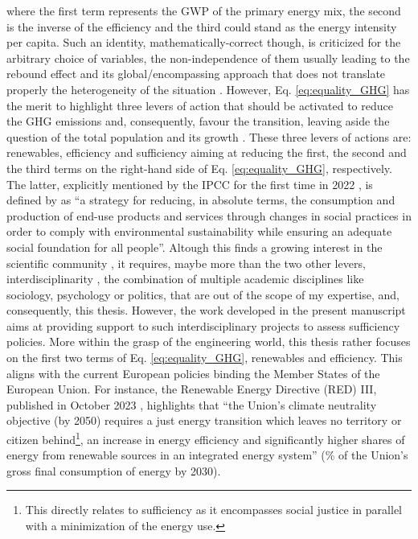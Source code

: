 \noindent
where the first term represents the \gls{GWP} of the primary energy mix, the second is the inverse of the efficiency and the third could stand as the energy intensity per capita. Such an identity, mathematically-correct though, is criticized for the arbitrary choice of variables, the non-independence of them usually leading to the rebound effect and its global/encompassing approach that does not translate properly the heterogeneity of the situation \cite{IPCC2000}. However, Eq. \ref{eq:equality_GHG} has the merit to highlight three levers of action that should be activated to reduce the \gls{GHG} emissions and, consequently, favour the transition, leaving aside the question of the total population and its growth \cite{dodson2020population,scovronick2017impact}. These three levers of actions are: renewables, efficiency and sufficiency aiming at reducing the first, the second and the third terms on the right-hand side of Eq. \ref{eq:equality_GHG}, respectively. The latter, explicitly mentioned by the IPCC for the first time in 2022 \cite{IPCC2022}, is defined by \citet{lage2023citizens} as ``a strategy for reducing, in absolute terms, the consumption and production of end-use products and services through changes in social practices in order to comply with environmental sustainability while ensuring an adequate social foundation for all people''. Altough this finds a growing interest in the scientific community \cite{o2018good}, it requires, maybe more than the two other levers, interdisciplinarity \cite{schmidt2015interdisciplinary}, \ie the combination of multiple academic disciplines like sociology, psychology or politics, that are out of the scope of my expertise, and, consequently, this thesis. However, the work developed in the present manuscript aims at providing support to such interdisciplinary projects to assess sufficiency policies. More within the grasp of the engineering world, this thesis rather focuses on the first two terms of Eq. \ref{eq:equality_GHG}, \ie renewables and efficiency. This aligns with the current European policies binding the Member States of the European Union. For instance, the Renewable Energy Directive (RED) III, published in October 2023 \cite{REDIII}, highlights that ``the Union’s climate neutrality objective (by 2050) requires a just energy transition which leaves no territory or citizen behind\footnote{This directly relates to sufficiency as it encompasses social justice in parallel with a minimization of the energy use.}, an increase in energy efficiency and significantly higher shares of energy from renewable sources in an integrated energy system'' (\% of the Union's gross final consumption of energy by 2030). 

